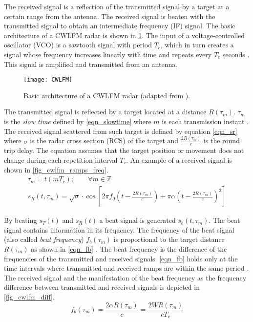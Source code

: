 The received signal is a reflection of the transmitted signal by a target at a certain range from the antenna. The received signal is beaten with the transmitted signal to obtain an intermediate frequency (IF) signal. The basic architecture of a CWLFM radar is shown in \cref{fig_cwlfm_arch}. The input of a voltage-controlled oscillator (VCO) is a sawtooth signal with period $T_c$, which in turn creates a signal whose frequency increases linearly with time and repeats every $T_c$ seconds \cite{Sardinero2022}. This signal is amplified and transmitted from an antenna.
\begin{figure}[ht]
	\centering
	\texttt{[image: CWLFM]}
	\caption[Basic architecture of a CWLFM radar.]{Basic architecture of a CWLFM radar (adapted from \cite{Sardinero2022}).}
	\label{fig_cwlfm_arch}
\end{figure}

The transmitted signal is reflected by a target located at a distance $R(\tau_m)$. $\tau_m$ is the \textit{slow time} defined by \cref{eqn_slowtime} where $m$ is each transmission instant \cite{Ziemer2009}. The received signal scattered from such target is defined by equation \cref{eqn_sr} \cite{Ziemer2009,Sardinero2022} where $\sigma$ is the radar cross section (RCS) of the target and $\frac{2R(\tau_m)}{c}$ is the round trip delay. The equation assumes that the target position or movement does not change during each repetition interval $T_c$. An example of a received signal is shown in \cref{fig_cwlfm_ramps_freq}.
\begin{gather}
	\tau_m = t(m T_c); \qquad \forall m \in \mathbb{Z} \label{eqn_slowtime}\\
	s_R(t, \tau_m) = \sqrt{\sigma} \cdot \cos\left[ 2 \pi f_0 \left( t - \frac{2R(\tau_m)}{c}\right) + \pi \alpha \left( t - \frac{2R(\tau_m)}{c}\right)^2 \right] \label{eqn_sr}
\end{gather}

By beating $s_T(t)$ and $s_R(t)$ a beat signal is generated $s_b(t, \tau_m)$. The beat signal contains information in its frequency. The frequency of the beat signal (also called \textit{beat frequency}) $f_b(\tau_m)$ is proportional to the target distance $R(\tau_m)$ as shown in \cref{eqn_fb} \cite{Sardinero2022}. The beat frequency is the difference of the frequencies of the transmitted and received signals. \cref{eqn_fb} holds only at the time intervals where transmitted and received ramps are within the same period \cite{Sardinero2022}. The received signal and the manifestation of the beat frequency as the frequency difference between transmitted and received signals is depicted in \cref{fig_cwlfm_diff}.
\begin{equation} \label{eqn_fb}
	f_b(\tau_m)=\frac{2 \alpha R(\tau_m)}{c} = \frac{2 W R(\tau_m)}{c T_c}
\end{equation}


